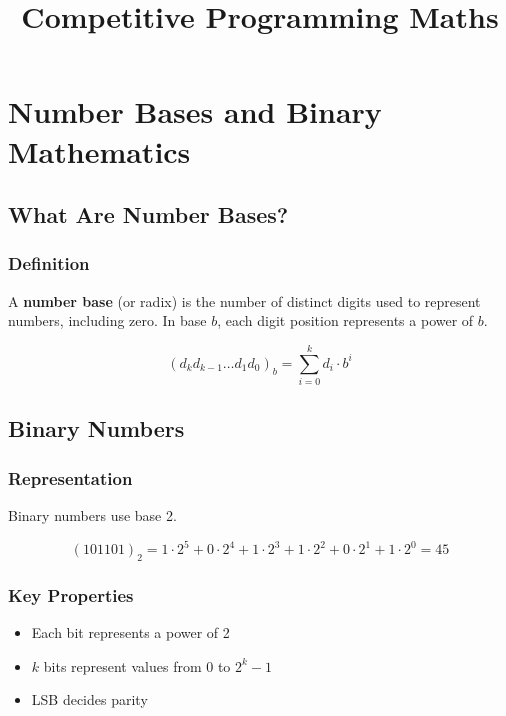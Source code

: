 \documentclass[11pt]{article}
\title{\textbf{Competitive Programming Maths}}
\author{}
\date{}
\begin{document}
\maketitle
\tableofcontents
\newpage


\section{Number Bases and Binary Mathematics}

\subsection{What Are Number Bases?}

\subsubsection{Definition}
A \textbf{number base} (or radix) is the number of distinct digits used to represent numbers, including zero.
In base $b$, each digit position represents a power of $b$.

\[
(d_k d_{k-1} \ldots d_1 d_0)_b = \sum_{i=0}^{k} d_i \cdot b^i
\]

\subsection{Binary Numbers}

\subsubsection{Representation}
Binary numbers use base 2.

\[
(101101)_2 = 1\cdot2^5 + 0\cdot2^4 + 1\cdot2^3 + 1\cdot2^2 + 0\cdot2^1 + 1\cdot2^0 = 45
\]

\subsubsection{Key Properties}
\begin{itemize}
    \item Each bit represents a power of 2
    \item $k$ bits represent values from $0$ to $2^k - 1$
    \item LSB decides parity
\end{itemize}
\end{document}
